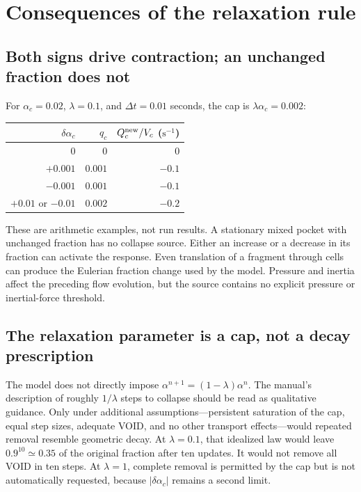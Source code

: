 \documentclass[11pt,letterpaper]{article}
\begin{document}
\section{Consequences of the relaxation rule}

\subsection{Both signs drive contraction; an unchanged fraction does not}

For $\alpha_c=0.02$, $\lambda=0.1$, and $\Delta t=0.01$ seconds, the cap is
$\lambda\alpha_c=0.002$:
\begin{center}
\begin{tabular}{@{}rrr@{}}
\toprule
$\delta\alpha_c$ & $q_c$ & $Q_c^{\rm new}/V_c$ ($\mathrm{s}^{-1}$)\\
\midrule
$0$ & $0$ & $0$\\
$+0.001$ & $0.001$ & $-0.1$\\
$-0.001$ & $0.001$ & $-0.1$\\
$+0.01$ or $-0.01$ & $0.002$ & $-0.2$\\
\bottomrule
\end{tabular}
\end{center}
These are arithmetic examples, not run results. A stationary mixed pocket
with unchanged fraction has no collapse source. Either an increase or a
decrease in its fraction can activate the response. Even translation of a
fragment through cells can produce the Eulerian fraction change used by the
model. Pressure and inertia affect the preceding flow evolution, but the
source contains no explicit pressure or inertial-force threshold.

\subsection{The relaxation parameter is a cap, not a decay prescription}

The model does not directly impose
$\alpha^{n+1}=(1-\lambda)\alpha^n$. The manual's description of roughly
$1/\lambda$ steps to collapse should be read as qualitative guidance.
Only under additional assumptions---persistent saturation of the cap,
equal step sizes, adequate VOID, and no other transport effects---would
repeated removal resemble geometric decay. At $\lambda=0.1$, that idealized
law would leave $0.9^{10}\simeq0.35$ of the original fraction after ten
updates. It would not remove all VOID in ten steps. At $\lambda=1$, complete
removal is permitted by the cap but is not automatically requested, because
$|\delta\alpha_c|$ remains a second limit.
\end{document}
